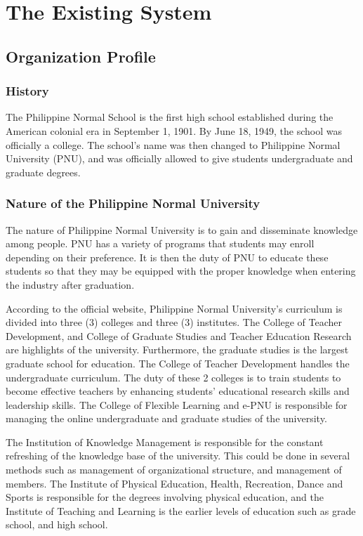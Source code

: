 \chapter{The Existing System}

\section{Organization Profile}

\subsection{History}
The Philippine Normal School is the first high school established during the American colonial era in September 1, 1901. By June 18, 1949, the school was officially a college. The school's name was then changed to Philippine Normal University (PNU), and was officially allowed to give students undergraduate and graduate degrees.

\subsection{Nature of the Philippine Normal University}
The nature of Philippine Normal University is to gain and disseminate knowledge among people. PNU has a variety of programs that students may enroll depending on their preference. It is then the duty of PNU to educate these students so that they may be equipped with the proper knowledge when entering the industry after graduation.

 According to the official website, Philippine Normal University's curriculum is divided into three (3) colleges and three (3) institutes. The College of Teacher Development, and College of Graduate Studies and Teacher Education Research are highlights of the university. Furthermore, the graduate studies is the largest graduate school for education. The College of Teacher Development handles the undergraduate curriculum. The duty of these 2 colleges is to train students to become effective teachers by enhancing students' educational research skills and leadership skills. The College of Flexible Learning and e-PNU is responsible for managing the online undergraduate and graduate studies of the university. 

The Institution of Knowledge Management is responsible for the constant refreshing of the knowledge base of the university. This could be done in several methods such as management of organizational structure, and management of members. The Institute of Physical Education, Health, Recreation, Dance and Sports is responsible for the degrees involving physical education, and the Institute of Teaching and Learning is the earlier levels of education such as grade school, and high school.

